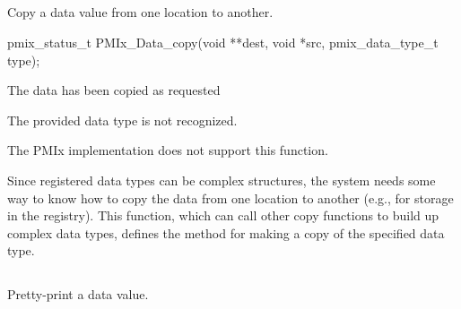 \subsection{}

\summary

Copy a data value from one location to another.

\format

\cspecificstart
\begin{codepar}
pmix_status_t
PMIx_Data_copy(void **dest, void *src,
               pmix_data_type_t type);
\end{codepar}
\cspecificend

\begin{arglist}
\end{arglist}

\begin{constantdesc}
\item {} The data has been copied as requested
\item {} The provided data type is not recognized.
\item {} The \ac{PMIx} implementation does not support this function.
\end{constantdesc}

\descr

Since registered data types can be complex structures, the system needs some way to know how to copy the data from one location to another (e.g., for storage in the registry). This function, which can call other copy functions to build up complex data types, defines the method for making a copy of the specified data type.


\subsection{}

\summary

Pretty-print a data value.

\format

